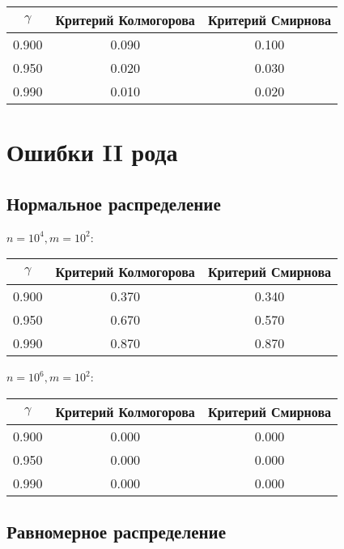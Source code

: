 \documentclass[12pt, a4paper]{article}
\begin{document}
\begin{center}
    \begin{tabular}{|c|c|c|}
         \hline \boldmath$\gamma$ & \textbf{Критерий Колмогорова} & \textbf{Критерий Смирнова} \\
         \hline 0.900&0.090&0.100 \\
         \hline 0.950&0.020&0.030  \\
         \hline 0.990&0.010&0.020 \\
         \hline
    \end{tabular}
\end{center}

\newpage
\section{Ошибки II рода}


\subsection{Нормальное распределение}

$n = 10^4, m = 10^2$:
\begin{center}
    \begin{tabular}{|c|c|c|}
         \hline \boldmath$\gamma$ & \textbf{Критерий Колмогорова} & \textbf{Критерий Смирнова} \\
         \hline 0.900 & 0.370 & 0.340 \\
         \hline 0.950 & 0.670 & 0.570 \\
         \hline 0.990 & 0.870 & 0.870 \\
         \hline
    \end{tabular}
\end{center}

$n = 10^6, m = 10^2$:

\begin{center}
    \begin{tabular}{|c|c|c|}
         \hline \boldmath$\gamma$ & \textbf{Критерий Колмогорова} & \textbf{Критерий Смирнова} \\
         \hline 0.900 & 0.000 & 0.000 \\
         \hline 0.950 & 0.000 & 0.000  \\
         \hline 0.990 & 0.000 & 0.000 \\
         \hline
    \end{tabular}
\end{center}

\subsection{Равномерное распределение}
\end{document}
